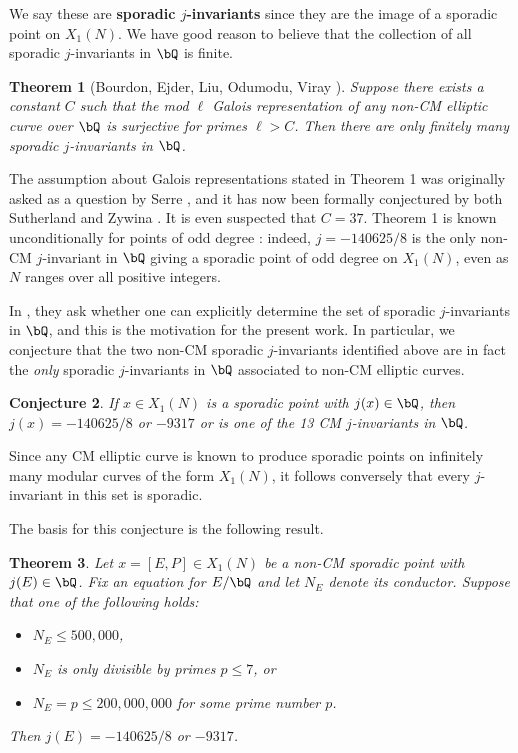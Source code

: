 \documentclass[11pt,reqno]{amsart}
\theoremstyle{plain}
\newtheorem{theorem}{Theorem}%
\newtheorem{conjecture}[theorem]{Conjecture}
\theoremstyle{definition}
\newcommand{\Q}{\bQ}
\begin{document}
We say these are \textbf{sporadic $j$-invariants} since they are the image of a sporadic point on $X_1(N)$. We have good reason to believe that the collection of all sporadic $j$-invariants in $\Q$ is finite.
\begin{theorem}[Bourdon, Ejder, Liu, Odumodu, Viray \cite{BELOV}]
Suppose there exists a constant $C$ such that the mod $\ell$ Galois representation of any non-CM elliptic curve over $\Q$ is surjective for primes $\ell>C$. Then there are only finitely many sporadic $j$-invariants in $\Q$.
\end{theorem}

\noindent The assumption about Galois representations stated in Theorem 1 was originally asked as a question by Serre \cite{serre72}, and it has now been formally conjectured by both Sutherland \cite{sutherland} and Zywina \cite{ZywinaImages}. It is even suspected that $C=37$. Theorem 1 is known unconditionally for points of odd degree \cite{OddDeg}: indeed, $j=-140625/8$ is the only non-CM $j$-invariant in $\Q$ giving a sporadic point of odd degree on $X_1(N)$, even as $N$ ranges over all positive integers. 

In \cite{BELOV}, they ask whether one can explicitly determine the set of sporadic $j$-invariants in $\Q$, and this is the motivation for the present work. In particular, we conjecture that the two non-CM sporadic $j$-invariants identified above are in fact the \emph{only} sporadic $j$-invariants in $\Q$ associated to non-CM elliptic curves. 

\begin{conjecture}
If $x\in X_1(N)$ is a sporadic point with $j(x) \in \Q$, then $j(x)=-140625/8$ or $-9317$ or is one of the 13 CM $j$-invariants in $\Q$. 
\end{conjecture}

\noindent Since any CM elliptic curve is known to produce sporadic points on infinitely many modular curves of the form $X_1(N)$, it follows conversely that every $j$-invariant in this set is sporadic.

The basis for this conjecture is the following result.

\begin{theorem}
Let $x=[E,P]\in X_1(N)$ be a non-CM sporadic point with $j(E) \in \Q$.
Fix an equation for $E/\Q$ and let $N_E$ denote its conductor.
Suppose that one of the following holds:
\begin{itemize}
    \item$N_E \leq 500{,}000$,
    \item $N_E$ is only divisible by primes $p \leq 7$, or
    \item $N_E=p \leq 200{,}000{,}000$ for some prime number $p$.
\end{itemize}
Then $j(E) =-140625/8$ or $-9317$.
\end{theorem}
\end{document}
